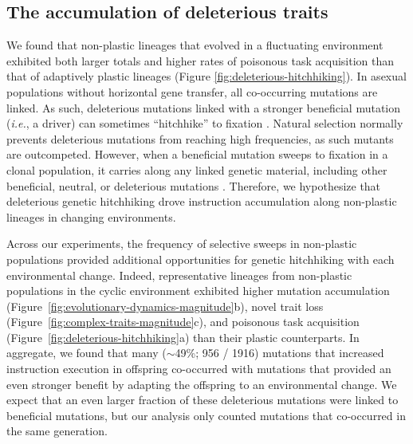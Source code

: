 \subsection{The accumulation of deleterious traits}

We found that non-plastic lineages that evolved in a fluctuating environment exhibited both larger totals and higher rates of poisonous task acquisition than that of adaptively plastic lineages (Figure \ref{fig:deleterious-hitchhiking}).
In asexual populations without horizontal gene transfer, all co-occurring mutations are linked.
As such, deleterious mutations linked with a stronger beneficial mutation (\textit{i.e.}, a driver) can sometimes ``hitchhike'' to fixation \citep{smith_hitch-hiking_1974,van_den_bergh_experimental_2018,buskirk_hitchhiking_2017}.
Natural selection normally prevents deleterious mutations from reaching high frequencies, as such mutants are outcompeted.
However, when a beneficial mutation sweeps to fixation in a clonal population, it carries along any linked genetic material, including other beneficial, neutral, or deleterious mutations \citep{barton_genetic_2000, smith_hitch-hiking_1974}.
Therefore, we hypothesize that deleterious genetic hitchhiking drove  instruction accumulation along non-plastic lineages in changing environments.

Across our experiments, the frequency of selective sweeps in non-plastic populations provided additional opportunities for genetic hitchhiking with each environmental change. 
Indeed, representative lineages from non-plastic populations in the cyclic environment exhibited higher mutation accumulation (Figure~\ref{fig:evolutionary-dynamics-magnitude}b), novel trait loss (Figure~\ref{fig:complex-traits-magnitude}c), and poisonous task acquisition (Figure~\ref{fig:deleterious-hitchhiking}a) than their plastic counterparts.
In aggregate, we found that many ($\sim$49\%; 956 / 1916) mutations that increased  instruction execution in offspring co-occurred with mutations that provided an even stronger benefit by adapting the offspring to an environmental change.
We expect that an even larger fraction of these deleterious mutations were linked to beneficial mutations, but our analysis only counted mutations that co-occurred in the same generation.


